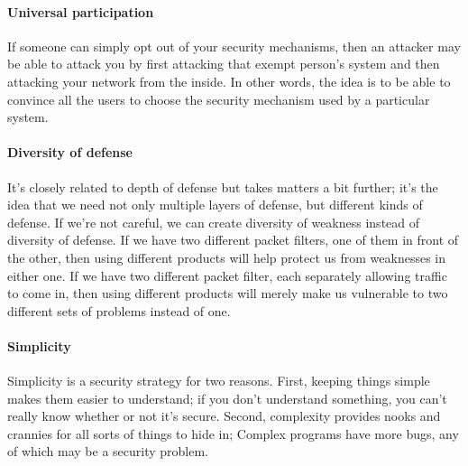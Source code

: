 \documentclass[11pt]{article}
\begin{document}
\paragraph{Universal participation} If someone can simply opt out of your security mechanisms, then an attacker may be able to attack you by first attacking that exempt person's system and then attacking your network from the inside. In other words, the idea is to be able to convince all the users to choose the security mechanism used by a particular system.
\paragraph{Diversity of defense} It's closely related to depth of defense but takes matters a bit further; it's the idea that we need not only multiple layers of defense, but different kinds of defense. If we're not careful, we can create diversity of weakness instead of diversity of defense. If we have two different packet filters, one of them in front of the other, then using different products will help protect us from weaknesses in either one. If we have two different packet filter, each separately allowing traffic to come in, then using different products will merely make us vulnerable to two different sets of problems instead of one.
\paragraph{Simplicity} Simplicity is a security strategy for two reasons. First, keeping things simple makes them easier to understand; if you don't understand something, you can't really know whether or not it's secure. Second, complexity provides nooks and crannies for all sorts of things to hide in; Complex programs have more bugs, any of which may be a security problem.
\end{document}
